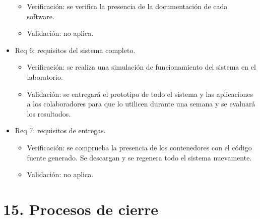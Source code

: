 \documentclass[
11pt, %
]{charter}
\begin{document}
\begin{itemize}
	\begin{itemize}
	\item Verificación: se verifica la presencia de la documentación de cada software.
	\item Validación: no aplica.
	\end{itemize}	
		
\item Req 6: requisitos del sistema completo.

	\begin{itemize}
	\item Verificación: se realiza una simulación de funcionamiento del sistema en el laboratorio.
	\item Validación: se entregará el prototipo de todo el sistema y las aplicaciones a los colaboradores para que lo utilicen durante una semana y se evaluará los resultados.
	\end{itemize}		

\item Req 7: requisitos de entregas.

	\begin{itemize}
	\item Verificación: se comprueba la presencia de los contenedores con el código fuente generado. Se descargan y se regenera todo el sistema nuevamente.
	\item Validación: no aplica.
	\end{itemize}			

\end{itemize}

\section{15. Procesos de cierre}    
\label{sec:cierre}


\end{document}
